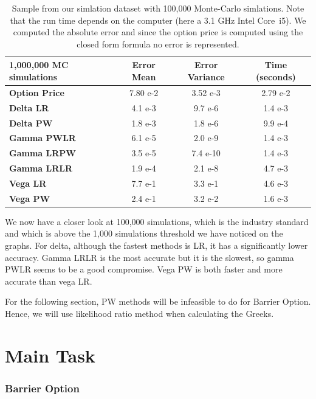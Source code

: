 \documentclass[11pt,a4paper,fleqn]{article}
\begin{document}
\begin{table} [h!]
  \centering
\label{eco:values}
\begin{tabular}{|l|c|c|c|}
\hline
1,000,000 MC simulations      & \textbf{Error Mean} & \textbf{Error Variance} & \textbf{Time (seconds)} \\ \hline
\textbf{Option Price} & 7.80 e-2 & 3.52 e-3 & 2.79 e-2 \\ \hline
\textbf{Delta LR} & 4.1 e-3 & 9.7 e-6 & 1.4 e-3\\
\textbf{Delta PW} & 1.8 e-3 & 1.8 e-6 & 9.9 e-4\\ \hline
\textbf{Gamma PWLR} & 6.1 e-5 & 2.0 e-9 & 1.4 e-3\\
\textbf{Gamma LRPW} & 3.5 e-5 & 7.4 e-10 & 1.4 e-3\\
\textbf{Gamma LRLR} & 1.9 e-4 & 2.1 e-8 & 4.7 e-3\\ \hline
\textbf{Vega LR} & 7.7 e-1 & 3.3 e-1 & 4.6 e-3\\
\textbf{Vega PW} & 2.4 e-1 & 3.2 e-2 & 1.6 e-3\\ \hline
\end{tabular}

\caption{Sample from our simlation dataset with 100,000 Monte-Carlo simlations. Note that the run time depends on the computer (here a 3.1 GHz Intel Core~i5). We computed the absolute error and since the option price is computed using the closed form formula no error is represented.}

\end{table}

We now have a closer look at 100,000 simulations, which is the industry standard and which is above the 1,000 simulations threshold we have noticed on the graphs.
For delta, although the fastest methods is LR, it has a significantly lower accuracy. Gamma LRLR is the most accurate but it is the slowest, so gamma PWLR seems to be a good compromise. Vega PW is both faster and more accurate than vega LR.

For the following section, PW methods will be infeasible to do for Barrier Option. Hence, we will use likelihood ratio method when calculating the Greeks.

\FloatBarrier
\newpage
\part{Main Task}
\section{Barrier Option}
\end{document}
